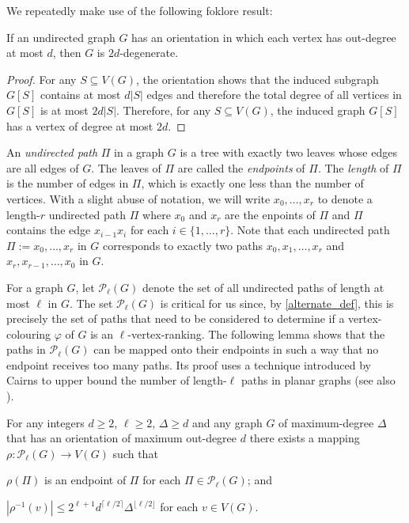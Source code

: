 \documentclass{patmorin}
\newcommand{\defin}[1]{\emph{\color{brightmaroon}#1}}
\begin{document}
We repeatedly make use of the following foklore result:

\begin{obs}\label{orientation_to_degeneracy}
  If an undirected graph $G$ has an orientation in which each vertex has out-degree at most $d$, then $G$ is $2d$-degenerate.
\end{obs}

\begin{proof}
  For any $S\subseteq V(G)$, the orientation shows that the induced subgraph $G[S]$ contains at most $d|S|$ edges and therefore the total degree of all vertices in $G[S]$ is at most $2d|S|$.  Therefore, for any $S\subseteq V(G)$, the induced graph $G[S]$ has a vertex of degree at most $2d$.
\end{proof}

An \defin{undirected path} $\Pi$ in a graph $G$ is a tree with exactly two leaves whose edges are all edges of $G$. The leaves of $\Pi$ are called the \defin{endpoints} of $\Pi$. The \defin{length} of $\Pi$ is the number of edges in $\Pi$, which is exactly one less than the number of vertices.  With a slight abuse of notation, we will write $x_0,\ldots,x_r$ to denote a length-$r$ undirected path $\Pi$ where $x_0$ and $x_r$ are the enpoints of $\Pi$ and $\Pi$ contains the edge $x_{i-1}x_i$ for each $i\in\{1,\ldots,r\}$.  Note that each undirected path $\Pi:=x_0,\ldots,x_r$ in $G$ corresponds to exactly two paths $x_0,x_1,\ldots,x_r$ and $x_r,x_{r-1},\ldots,x_0$ in $G$.

For a graph $G$, let $\mathcal{P}_\ell(G)$ denote the set of all undirected paths of length at most $\ell$ in $G$.  The set $\mathcal{P}_\ell(G)$ is critical for us since, by \cref{alternate_def}, this is precisely the set of paths that need to be considered to determine if a vertex-colouring $\varphi$ of $G$ is an $\ell$-vertex-ranking.  The following lemma shows that the paths in $\mathcal{P}_\ell(G)$ can be mapped onto their endpoints in such a way that no endpoint receives too many paths.  Its proof uses a technique introduced by Cairns to upper bound the number of length-$\ell$ paths in planar graphs (see also \cite[Lemma~5]{devroye.dujmovic.ea:notes}).

\begin{lem}\label{advanced_cairns}
  For any integers $d\ge 2$, $\ell\ge 2$, $\Delta\ge d$ and any
  graph $G$ of maximum-degree $\Delta$ that has an orientation of maximum out-degree $d$ there exists a mapping $\rho:\mathcal{P}_\ell(G)\to V(G)$ such that
  \begin{compactenum}[(i)]
    \item $\rho(\Pi)$ is an endpoint of $\Pi$ for each $\Pi\in\mathcal{P}_\ell(G)$; and
    \item $|\rho^{-1}(v)| \le 2^{\ell+1}d^{\lceil \ell/2\rceil}\Delta^{\lfloor\ell/2\rfloor}$ for each $v\in V(G)$.
  \end{compactenum}
\end{lem}
\end{document}
